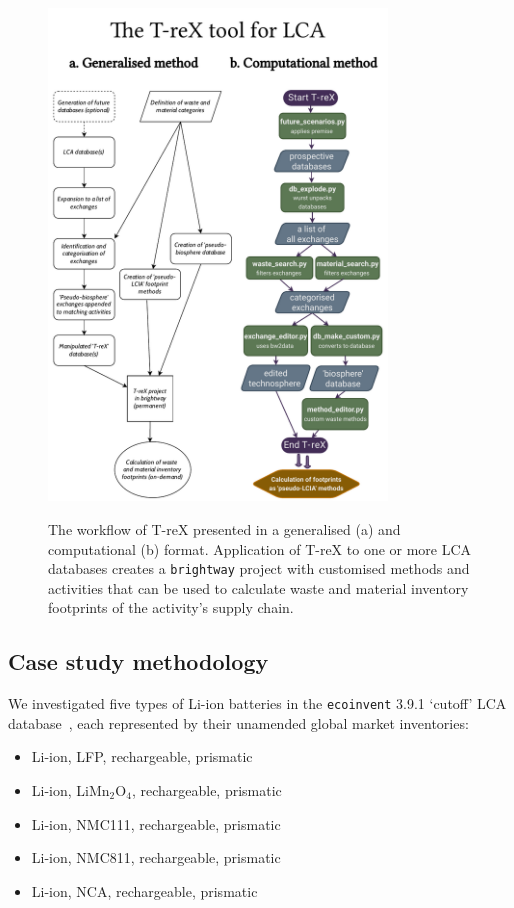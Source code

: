 \begin{figure}[H]
    \centering
    \caption{The workflow of T-reX presented in a generalised (a) and computational (b) format. Application of T-reX to one or more LCA databases creates a \texttt{brightway} project with customised methods and activities that can be used to calculate waste and material inventory footprints of the activity's supply chain.}
    \includegraphics[width=9cm]{figures/T-reX_method.pdf}\label{fig:methods-flowchart}
\end{figure}


\subsection{Case study methodology}\label{sec:method-casestudy}

We investigated five types of Li-ion batteries in the \texttt{ecoinvent} 3.9.1 `cutoff' LCA database~\citep{ecoinvent2016version3}, each represented by their unamended global market inventories:
\begin{itemize}[itemsep=0pt]
    \item Li-ion, LFP, rechargeable, prismatic
    \item Li-ion, LiMn\(_2\)O\(_4\), rechargeable, prismatic
    \item Li-ion, NMC111, rechargeable, prismatic
    \item Li-ion, NMC811, rechargeable, prismatic
    \item Li-ion, NCA, rechargeable, prismatic
\end{itemize}

